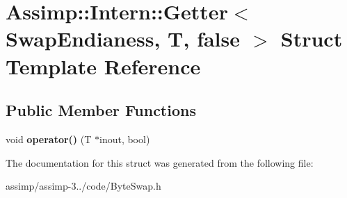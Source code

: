 \hypertarget{struct_assimp_1_1_intern_1_1_getter_3_01_swap_endianess_00_01_t_00_01false_01_4}{\section{Assimp\+:\+:Intern\+:\+:Getter$<$ Swap\+Endianess, T, false $>$ Struct Template Reference}
\label{struct_assimp_1_1_intern_1_1_getter_3_01_swap_endianess_00_01_t_00_01false_01_4}
}
\subsection*{Public Member Functions}
\begin{DoxyCompactItemize}
\item 
\hypertarget{struct_assimp_1_1_intern_1_1_getter_3_01_swap_endianess_00_01_t_00_01false_01_4_a07ac44e7068dc4aace1215ff4f9a58d9}{void {\bfseries operator()} (T $\ast$inout, bool)}\label{struct_assimp_1_1_intern_1_1_getter_3_01_swap_endianess_00_01_t_00_01false_01_4_a07ac44e7068dc4aace1215ff4f9a58d9}

\end{DoxyCompactItemize}


The documentation for this struct was generated from the following file\+:\begin{DoxyCompactItemize}
\item 
assimp/assimp-\/3../code/Byte\+Swap.\+h\end{DoxyCompactItemize}
